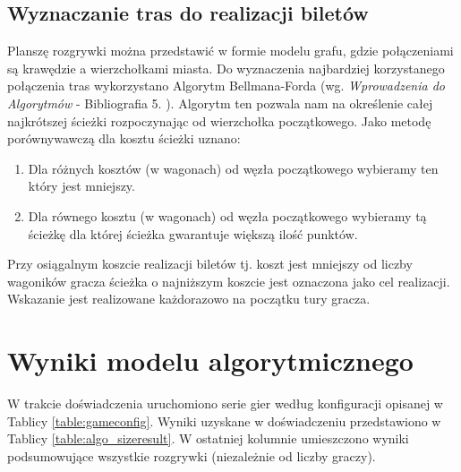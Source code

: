 \documentclass[12pt, oneside]{report}
\begin{document}
\subsection{Wyznaczanie tras do realizacji biletów}
Planszę rozgrywki można przedstawić w formie modelu grafu, gdzie połączeniami są krawędzie a wierzchołkami miasta. Do wyznaczenia najbardziej korzystanego połączenia tras wykorzystano Algorytm Bellmana-Forda (wg. \textit{Wprowadzenia do Algorytmów} - Bibliografia 5. ). Algorytm ten pozwala nam na określenie całej najkrótszej ścieżki rozpoczynając od wierzchołka początkowego. Jako metodę porównywawczą dla kosztu ścieżki uznano:
\begin{enumerate}
	\item Dla różnych kosztów (w wagonach) od węzła początkowego wybieramy ten który jest mniejszy.
	\item Dla równego kosztu (w wagonach) od węzła początkowego wybieramy tą ścieżkę dla której ścieżka gwarantuje większą ilość punktów.
\end{enumerate}
Przy osiągalnym koszcie realizacji biletów tj. koszt jest mniejszy od liczby wagoników gracza ścieżka o najniższym koszcie jest oznaczona jako cel realizacji. Wskazanie jest realizowane każdorazowo na początku tury gracza.
\section{Wyniki modelu algorytmicznego}
W trakcie doświadczenia uruchomiono serie gier według konfiguracji opisanej w Tablicy \ref{table:gameconfig}. Wyniki uzyskane w doświadczeniu przedstawiono w Tablicy \ref{table:algo_sizeresult}. W ostatniej kolumnie umieszczono wyniki podsumowujące wszystkie rozgrywki (niezależnie od liczby graczy).
\end{document}
